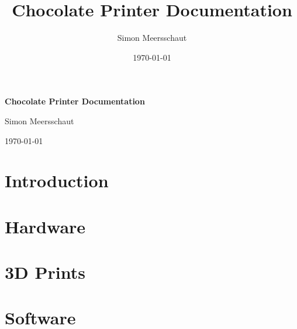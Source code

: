 \documentclass{article}
\title{Chocolate Printer Documentation}
\author{Simon Meersschaut}
\date{\today}
\begin{document}
\begin{titlepage}
\centering
\vspace*{\fill}
{\Huge \textbf{Chocolate Printer Documentation} \par}
\vspace{1cm}
{\Large Simon Meersschaut \par}
\vspace{0.5cm}
{\Large \today \par}
\vspace*{\fill}
\end{titlepage}

\tableofcontents

\newpage

\section{Introduction}


\newpage

\section{Hardware}


\newpage

\section{3D Prints}


\newpage

\section{Software}

\end{document}

